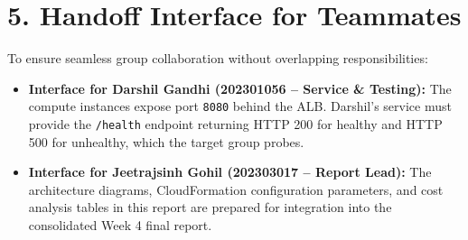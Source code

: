 \documentclass[11pt,a4paper]{article}
\newcommand{\sectionline}[1]{\section*{\color{navy}#1}}
\begin{document}
\sectionline{5. Handoff Interface for Teammates}
To ensure seamless group collaboration without overlapping responsibilities:
\begin{itemize}
    \item \textbf{Interface for Darshil Gandhi (202301056 -- Service \& Testing):} The compute instances expose port \texttt{8080} behind the ALB. Darshil's service must provide the \texttt{/health} endpoint returning HTTP 200 for healthy and HTTP 500 for unhealthy, which the target group probes.
    \item \textbf{Interface for Jeetrajsinh Gohil (202303017 -- Report Lead):} The architecture diagrams, CloudFormation configuration parameters, and cost analysis tables in this report are prepared for integration into the consolidated Week 4 final report.
\end{itemize}
\end{document}
